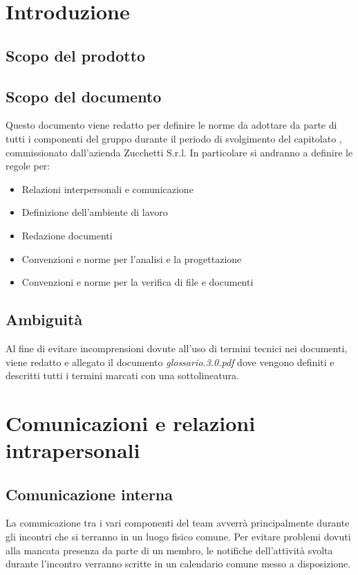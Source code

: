 

\setcounter{page}{1}
\pagestyle{normal}

\clearpage
\section{Introduzione}
\subsection{Scopo del prodotto}
\purpose

\subsection{Scopo del documento}
Questo documento viene redatto per definire le norme da adottare da parte di tutti i componenti del gruppo \team{} durante il periodo di svolgimento del capitolato \caName, commissionato dall'azienda Zucchetti S.r.l. In particolare si andranno a definire le regole per:
\begin{itemize}
\item Relazioni interpersonali e comunicazione
\item Definizione dell'ambiente di lavoro
\item Redazione documenti
\item Convenzioni e norme per l'analisi e la progettazione
\item Convenzioni e norme per la verifica di file e documenti
\end{itemize}

\subsection{Ambiguità}
Al fine di evitare incomprensioni dovute all'uso di termini tecnici nei documenti, viene redatto e allegato il documento \textit{glossario.3.0.pdf} dove vengono definiti e descritti tutti i termini marcati con una sottolineatura.
\clearpage

\section{Comunicazioni e relazioni intrapersonali}
\subsection{Comunicazione interna}
\label{sec:comunicazione_interna}
La comunicazione tra i vari componenti del team avverrà principalmente durante gli incontri che si terranno in un luogo fisico comune. Per evitare problemi dovuti alla mancata presenza da parte di un membro, le notifiche dell'attività svolta durante l'incontro verranno scritte in un calendario comune messo a disposizione.

